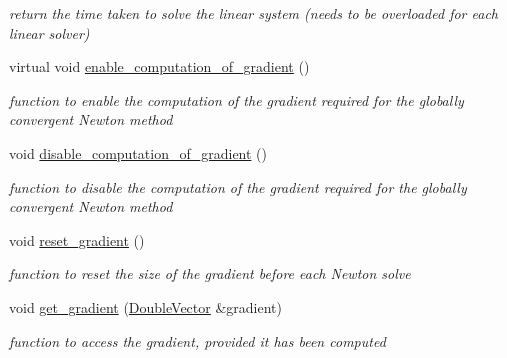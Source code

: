 \begin{DoxyCompactItemize}
\begin{DoxyCompactList}\small\item\em return the time taken to solve the linear system (needs to be overloaded for each linear solver) \end{DoxyCompactList}\item 
virtual void \hyperlink{classoomph_1_1LinearSolver_a37f1f8b8c6d45115e649739abd5d2f5d}{enable\+\_\+computation\+\_\+of\+\_\+gradient} ()
\begin{DoxyCompactList}\small\item\em function to enable the computation of the gradient required for the globally convergent Newton method \end{DoxyCompactList}\item 
void \hyperlink{classoomph_1_1LinearSolver_a8bc045e20074cb9b45ab3f304d037fc6}{disable\+\_\+computation\+\_\+of\+\_\+gradient} ()
\begin{DoxyCompactList}\small\item\em function to disable the computation of the gradient required for the globally convergent Newton method \end{DoxyCompactList}\item 
void \hyperlink{classoomph_1_1LinearSolver_aceef502cbdf826cdf6aa31f5803982e0}{reset\+\_\+gradient} ()
\begin{DoxyCompactList}\small\item\em function to reset the size of the gradient before each Newton solve \end{DoxyCompactList}\item 
void \hyperlink{classoomph_1_1LinearSolver_a6733411e85f0a1d6d82200c802481681}{get\+\_\+gradient} (\hyperlink{classoomph_1_1DoubleVector}{Double\+Vector} \&gradient)
\begin{DoxyCompactList}\small\item\em function to access the gradient, provided it has been computed \end{DoxyCompactList}\end{DoxyCompactItemize}
